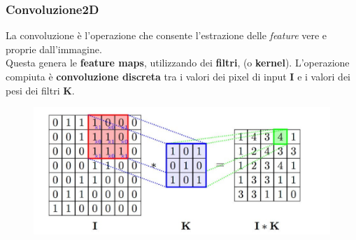 \documentclass{beamer}
\begin{document}
\begin{frame}
	\frametitle{Convoluzione2D}
	La convoluzione è l'operazione che consente l'estrazione delle \emph{feature} vere e proprie dall'immagine. \\
	Questa genera le \textbf{feature maps}, utilizzando dei \textbf{filtri}, (o \textbf{kernel}). 
	L'operazione compiuta è \textbf{convoluzione discreta} tra i valori dei pixel di input \textbf{I}
	e i valori dei pesi dei filtri \textbf{K}.



	\begin{figure}
		\includegraphics[width=1\textwidth]{convoluzione.PNG}
	\end{figure}
		
	
\end{frame}
\end{document}
